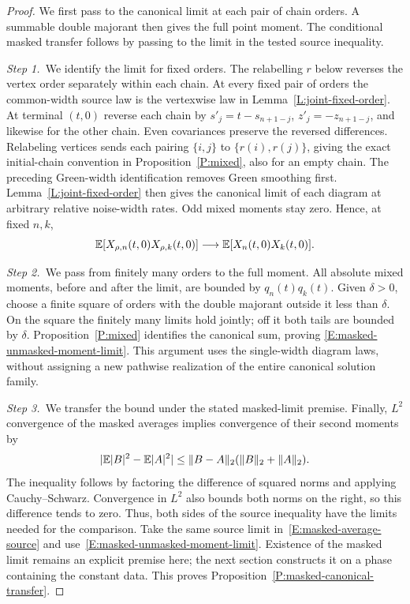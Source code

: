 \begin{proof}
  We first pass to the canonical limit at each pair of chain orders. A
  summable double majorant then gives the full point moment. The conditional
  masked transfer follows by passing to the limit in the tested source
  inequality.

  \medskip
  \noindent\textit{Step 1.~}We identify the limit for fixed orders.
  The relabelling $r$ below reverses the vertex order separately within each
  chain.
  At every fixed pair of orders the common-width source law is the vertexwise
  law in Lemma~\ref{L:joint-fixed-order}. At terminal $(t,0)$ reverse each chain
  by $s'_j = t-s_{n+1-j}$, $z'_j = -z_{n+1-j}$, and likewise for the other
  chain. Even covariances preserve the reversed differences. Relabeling vertices
  sends each pairing $\{i,j\}$ to $\{r(i),r(j)\}$, giving the exact
  initial-chain convention in Proposition~\ref{P:mixed}, also for an empty
  chain. The preceding Green-width identification removes Green smoothing first.
  Lemma~\ref{L:joint-fixed-order} then gives the canonical limit of each diagram
  at arbitrary relative noise-width rates. Odd mixed moments stay zero. Hence,
  at fixed $n,k$,
  \[
    \mathbb{E}[X_{\rho,n}(t,0)X_{\rho,k}(t,0)]
    \longrightarrow \mathbb{E}[X_n(t,0)X_k(t,0)].
  \]

  \medskip
  \noindent\textit{Step 2.~}We pass from finitely many orders to the full
  moment.
  All absolute mixed moments, before and after the limit, are bounded by
  $q_n(t)q_k(t)$. Given $\delta > 0$, choose a finite square of orders with the
  double majorant outside it less than $\delta$. On the square the finitely many
  limits hold jointly; off it both tails are bounded by $\delta$.
  Proposition~\ref{P:mixed} identifies the canonical sum, proving
  \eqref{E:masked-unmasked-moment-limit}. This argument uses the single-width
  diagram laws, without assigning a new pathwise realization of the entire
  canonical solution family.

  \medskip
  \noindent\textit{Step 3.~}We transfer the bound under the stated
  masked-limit premise.
  Finally, $L^2$ convergence of the masked averages implies convergence of their
  second moments by
  \[
    |\mathbb{E}|B|^2-\mathbb{E}|A|^2|
    \le\|B-A\|_2(\|B\|_2+\|A\|_2).
  \]
  The inequality follows by factoring the difference of squared norms and
  applying Cauchy--Schwarz. Convergence in $L^2$ also bounds both norms on the
  right, so this difference tends to zero. Thus, both sides of the source
  inequality have the limits needed for the comparison.
  Take the same source limit in~\eqref{E:masked-average-source} and
  use~\eqref{E:masked-unmasked-moment-limit}. Existence of the masked limit
  remains an explicit premise here; the next section constructs it on a phase
  containing the constant data. This proves
  Proposition~\ref{P:masked-canonical-transfer}.
\end{proof}
